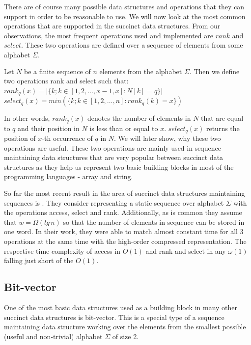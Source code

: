 There are of course many possible data structures and operations that they can support in order to be reasonable to use. We will now look at the most common operations that are supported in the succinct data structures. From our observations, the most frequent operations used and implemented are $rank$ and $select$. These two operations are defined over a sequence of elements from some alphabet $\Sigma$.

\begin{theorem}
Let $N$ be a finite sequence of $n$ elements from the alphabet $\Sigma$.
Then we define two operations rank and select such that: \\
$rank_q(x) = | \{k; k \in [ 1, 2, \ldots, x-1, x] : N[k] = q  \} |$ \\
$select_q(x) = min (\{k; k \in [ 1, 2, \ldots, n] : rank_q(k)=x  \}) $
\end{theorem}

In other words, $rank_q(x)$ denotes the number of elements in $N$ that are equal to $q$ and their position in $N$ is less than or equal to $x$. $select_q(x)$ returns the position of $x$-th occurrence of $q$ in $N$. We will later show, why these two operations are useful. These two operations are mainly used in sequence maintaining data structures that are very popular between succinct data structures as they help us represent two basic building blocks in most of the programming languages - array and string.

So far the most recent result in the area of succinct data structures maintaining sequences is \cite{belazzougui2015optimal}. They consider representing a static sequence over alphabet $\Sigma$ with the operations access, select and rank. Additionally, as is common they assume that $w=\Omega(lg\,n)$ so that the number of elements in sequence can be stored in one word. In their work, they were able to match almost constant time for all 3 operations at the same time with the high-order compressed representation. The respective time complexity of access in $O(1)$ and rank and select in any $\omega(1)$ falling just short of the $O(1)$.

\subsection{Bit-vector}

One of the most basic data structures used as a building block in many other succinct data structures is bit-vector. This is a special type of a sequence maintaining data structure working over the elements from the smallest possible (useful and non-trivial) alphabet $\Sigma$ of size 2.

